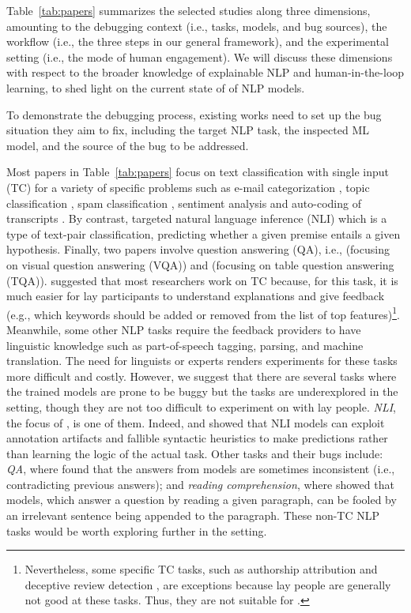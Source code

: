 Table~\ref{tab:papers} summarizes the selected studies
along three dimensions, amounting to 
the debugging context (i.e., tasks, models, and bug sources), the workflow (i.e., the three steps in our general framework), and the experimental setting (i.e., the mode of human engagement).
We will discuss these dimensions with respect to the broader knowledge of explainable NLP and human-in-the-loop learning, to shed light on the current state of \EBHD of NLP models.

\label{subsec:context}
To demonstrate the debugging process, existing works need to set up the bug situation they aim to fix, including the target NLP task, 
the inspected ML model,
and the source of the bug to be addressed.

Most papers in Table~\ref{tab:papers} focus on text classification with single input (TC) for 
a variety of specific problems such as e-mail categorization , topic classification , spam classification , sentiment analysis 
and auto-coding of transcripts .
By contrast,  targeted natural language inference (NLI) which is a type of text-pair classification, predicting whether a given premise entails a given hypothesis.
Finally, two papers involve question answering (QA), i.e.,  (focusing on visual question answering (VQA)) and 
(focusing on table question answering (TQA)).
 suggested that most researchers work on TC because, for this task, it is much easier for lay 
participants to understand explanations and give feedback (e.g., which keywords should be added or removed from the list of top features)\footnote{Nevertheless, some specific TC tasks, such as authorship attribution  and deceptive review detection , are exceptions because lay people are generally not good at these tasks. Thus, they are not suitable for \EBHD.}.
Meanwhile, some other NLP tasks require the feedback providers
to have linguistic knowledge such as part-of-speech tagging, parsing, and machine translation. 
The need for linguists or experts renders experiments for these tasks more difficult and costly.
However, we suggest that there are several tasks 
where the trained models are prone to be buggy but the tasks are underexplored in the \EBHD setting, though they are not too difficult to experiment on with lay people.
\textit{NLI}, the focus of , is one of them. Indeed,
 and  showed that NLI models can exploit annotation artifacts and fallible syntactic heuristics to make predictions rather than learning the logic of the actual task.
Other tasks and their bugs 
include:
\textit{QA}, where  found that the answers from models 
are sometimes inconsistent (i.e., contradicting previous answers); and \textit{reading comprehension}, where 
 showed that 
models, which answer a question by reading a given paragraph, can be fooled by an irrelevant sentence 
being appended to the paragraph. 
These non-TC NLP tasks would be worth exploring further in the \EBHD setting.

